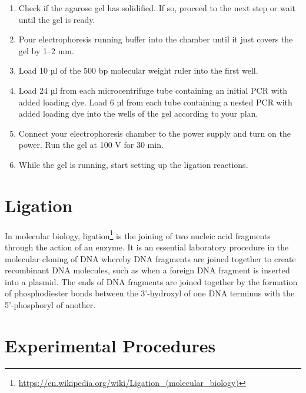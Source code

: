 \documentclass[]{book}
\let\rmarkdownfootnote\footnote%
\def\footnote{\protect\rmarkdownfootnote}
\renewcommand{\href}[2]{#2\footnote{\url{#1}}}
\begin{document}
\begin{enumerate}
\item
  Check if the agarose gel has solidified. If so, proceed to the next
  step or wait until the gel is ready.
\item
  Pour electrophoresis running buffer into the chamber until it just
  covers the gel by 1--2 mm.
\item
  Load 10 µl of the 500 bp molecular weight ruler into the first well.
\item
  Load 24 µl from each microcentrifuge tube containing an initial PCR
  with added loading dye. Load 6 µl from each tube containing a nested
  PCR with added loading dye into the wells of the gel according to your
  plan.
\item
  Connect your electrophoresis chamber to the power supply and turn on
  the power. Run the gel at 100 V for 30 min.
\item
  While the gel is running, start setting up the ligation reactions.
\end{enumerate}

\section{Ligation}\label{ligation}

In molecular biology,
\href{https://en.wikipedia.org/wiki/Ligation_(molecular_biology)}{ligation}
is the joining of two nucleic acid fragments through the action of an
enzyme. It is an essential laboratory procedure in the molecular cloning
of DNA whereby DNA fragments are joined together to create recombinant
DNA molecules, such as when a foreign DNA fragment is inserted into a
plasmid. The ends of DNA fragments are joined together by the formation
of phosphodiester bonds between the 3'-hydroxyl of one DNA terminus with
the 5'-phosphoryl of another.

\section{Experimental Procedures}\label{experimental-procedures-14}
\end{document}
